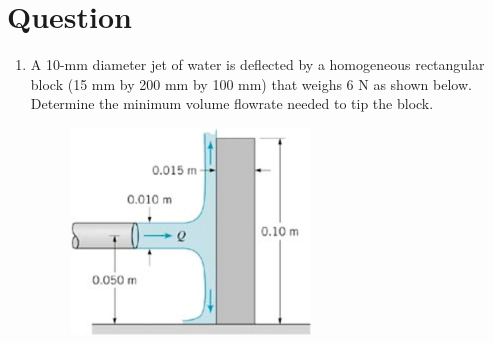 \documentclass[12pt,a4paper]{article}
\newcounter{question}
\newenvironment{questions}{
    \setcounter{question}{0}
    \section*{Question}
    \begin{enumerate}[leftmargin=1.5em,label={\arabic*．}]
}{
    \end{enumerate}
}
\begin{document}
\begin{questions}
\item A 10-mm diameter jet of water is deflected by a homogeneous rectangular block (15 mm by 200 mm by 100 mm) that weighs 6 N as shown below. Determine the minimum volume flowrate needed to tip the block. 

\begin{figure}[H]
  \centering
  \includegraphics[width=0.6\textwidth]{./figures/9.png}
\end{figure}


\end{questions}
\end{document}
